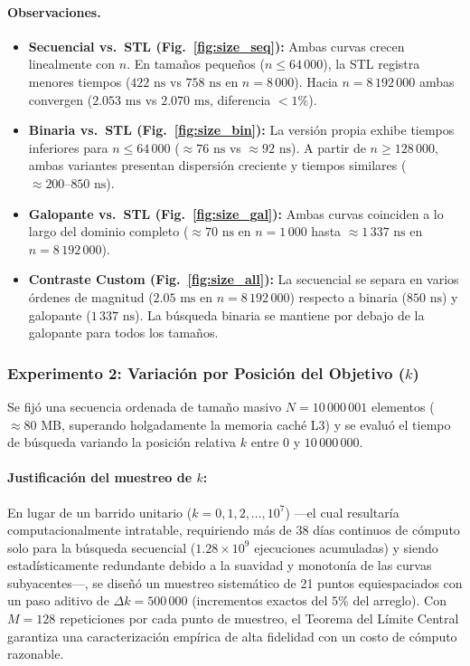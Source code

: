 \documentclass[11pt,letterpaper]{article}
\begin{document}
\paragraph{Observaciones.}
\begin{itemize}
    \item \textbf{Secuencial vs.\ STL (Fig.~\ref{fig:size_seq}):} Ambas curvas crecen linealmente con $n$. En tamaños pequeños ($n \le 64\,000$), la STL registra menores tiempos ($422\text{ ns}$ vs $758\text{ ns}$ en $n = 8\,000$). Hacia $n = 8\,192\,000$ ambas convergen ($2.053\text{ ms}$ vs $2.070\text{ ms}$, diferencia $< 1\%$).
    \item \textbf{Binaria vs.\ STL (Fig.~\ref{fig:size_bin}):} La versión propia exhibe tiempos inferiores para $n \le 64\,000$ ($\approx 76\text{ ns}$ vs $\approx 92\text{ ns}$). A partir de $n \ge 128\,000$, ambas variantes presentan dispersión creciente y tiempos similares ($\approx 200\text{--}850\text{ ns}$).
    \item \textbf{Galopante vs.\ STL (Fig.~\ref{fig:size_gal}):} Ambas curvas coinciden a lo largo del dominio completo ($\approx 70\text{ ns}$ en $n=1\,000$ hasta $\approx 1\,337\text{ ns}$ en $n=8\,192\,000$).
    \item \textbf{Contraste Custom (Fig.~\ref{fig:size_all}):} La secuencial se separa en varios órdenes de magnitud ($2.05\text{ ms}$ en $n = 8\,192\,000$) respecto a binaria ($850\text{ ns}$) y galopante ($1\,337\text{ ns}$). La búsqueda binaria se mantiene por debajo de la galopante para todos los tamaños.
\end{itemize}


\subsubsection{Experimento 2: Variación por Posición del Objetivo ($k$)}

Se fijó una secuencia ordenada de tamaño masivo $N = 10\,000\,001$ elementos ($\approx 80\text{ MB}$, superando holgadamente la memoria caché L3) y se evaluó el tiempo de búsqueda variando la posición relativa $k$ entre $0$ y $10\,000\,000$. 

\paragraph{Justificación del muestreo de $k$:}
En lugar de un barrido unitario ($k = 0, 1, 2, \dots, 10^7$) ---el cual resultaría computacionalmente intratable, requiriendo más de 38 días continuos de cómputo solo para la búsqueda secuencial ($1.28 \times 10^9$ ejecuciones acumuladas) y siendo estadísticamente redundante debido a la suavidad y monotonía de las curvas subyacentes---, se diseñó un muestreo sistemático de 21 puntos equiespaciados con un paso aditivo de $\Delta k = 500\,000$ (incrementos exactos del $5\%$ del arreglo). Con $M = 128$ repeticiones por cada punto de muestreo, el Teorema del Límite Central garantiza una caracterización empírica de alta fidelidad con un costo de cómputo razonable.
\end{document}
